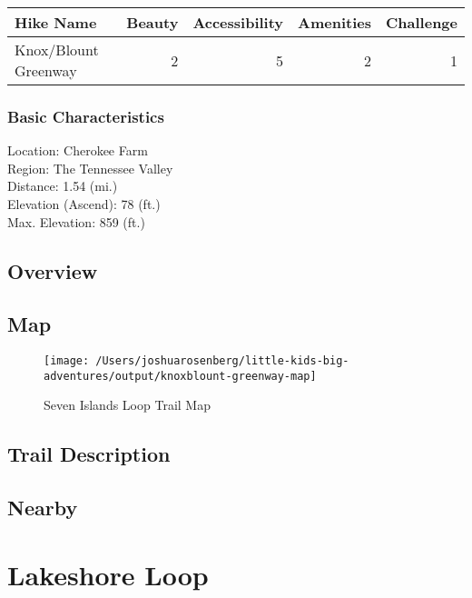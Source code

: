 \documentclass[
]{book}
\begin{document}
\begin{tabular}{l|r|r|r|r}
\hline
Hike Name & Beauty & Accessibility & Amenities & Challenge\\
\hline
Knox/Blount Greenway & 2 & 5 & 2 & 1\\
\hline
\end{tabular}

\hypertarget{basic-characteristics-3}{%
\subsection{Basic Characteristics}\label{basic-characteristics-3}}

Location: Cherokee Farm\\
Region: The Tennessee Valley\\
Distance: 1.54 (mi.)\\
Elevation (Ascend): 78 (ft.)\\
Max. Elevation: 859 (ft.)

\hypertarget{overview-3}{%
\section{Overview}\label{overview-3}}

\hypertarget{map-3}{%
\section{Map}\label{map-3}}

\begin{figure}
\texttt{[image: /Users/joshuarosenberg/little-kids-big-adventures/output/knoxblount-greenway-map]} \caption{Seven Islands Loop Trail Map}\label{fig:unnamed-chunk-15}
\end{figure}

\hypertarget{trail-description-3}{%
\section{Trail Description}\label{trail-description-3}}

\hypertarget{nearby-3}{%
\section{Nearby}\label{nearby-3}}

\hypertarget{lakeshore-loop}{%
\chapter{Lakeshore Loop}\label{lakeshore-loop}}
\end{document}
